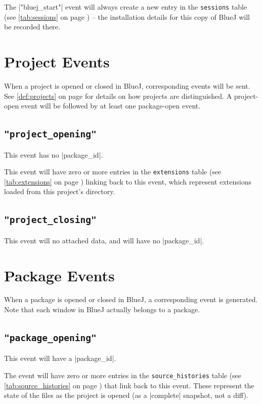\documentclass{report}
\newcommand{\myref}[1]{\autoref{#1} on page \pageref*{#1}}
\newcommand{\tabref}[1]{\lstinline|#1| table (see \myref{tab:#1})}
\begin{document}
The |"bluej_start"| event will always create a new entry in the
\tabref{sessions} -- the installation details for this copy of BlueJ will be
recorded there.

\section{Project Events}

When a project is opened or closed in BlueJ, corresponding events will be
sent.  See \myref{def:projects} for details on how projects are
distinguished.  A project-open event will be followed by at least one
package-open event.

\subsection{\lstinline!"project_opening"!}
\label{evt:project_opening}

This event has no |package_id|.

This event will have zero or more entries in the \tabref{extensions} linking
back to this event, which represent extensions loaded from this project's directory.

\subsection{\lstinline!"project_closing"!}
\label{evt:project_closing}

This event will no attached data, and will have no |package_id|.

\section{Package Events}

When a package is opened or closed in BlueJ, a corresponding event is
generated.  Note that each window in BlueJ actually belongs to a package.

\subsection{\lstinline!"package_opening"!}
\label{evt:package_opening}

This event will have a |package_id|.

The event will have zero or more entries in the \tabref{source_histories} that
link back to this event.  These represent the state of the files as the project is
opened (as a |complete| snapshot, not a diff).
\end{document}
